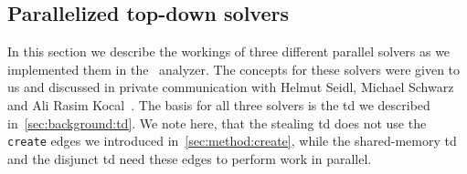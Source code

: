   \subsection{Parallelized top-down solvers}
  \label{sec:method:td_parallel}
  In this section we describe the workings of three different parallel solvers as we implemented them in the \gob\ analyzer. The concepts for these solvers were given to us and discussed in private communication with Helmut Seidl, Michael Schwarz and Ali Rasim Kocal~\cite{privCom}. The basis for all three solvers is the \ac{td} we described in~\autoref{sec:background:td}. We note here, that the stealing \ac{td} does not use the \texttt{create} edges we introduced in~\autoref{sec:method:create}, while the shared-memory \ac{td} and the disjunct \ac{td} need these edges to perform work in parallel.

